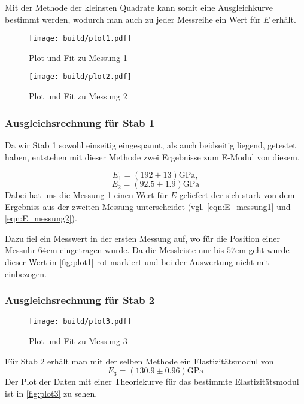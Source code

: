 Mit der Methode der kleinsten Quadrate kann somit eine Ausgleichkurve bestimmt
werden, wodurch man auch zu jeder Messreihe ein Wert für $E$ erhält.

\newpage
\begin{figure}[H]
	\texttt{[image: build/plot1.pdf]}
	\caption{Plot und Fit zu Messung 1}
	\label{fig:plot1}
\end{figure}
\begin{figure}[H]
	\texttt{[image: build/plot2.pdf]}
	\caption{Plot und Fit zu Messung 2}
	\label{fig:plot2}
\end{figure}
\subsubsection{Ausgleichsrechnung für Stab 1}
Da wir Stab 1 sowohl einseitig eingespannt, als auch beidseitig liegend,
getestet haben, entstehen mit dieser Methode zwei Ergebnisse zum E-Modul von diesem.

\begin{equation}
	E_1 = (192 \pm 13) \si{\giga\pascal},
	\label{eqn:E_messung1}
\end{equation}
\begin{equation}
	E_2 = (92.5 \pm 1.9) \si{\giga\pascal}
	\label{eqn:E_messung2}
\end{equation}
Dabei hat uns die Messung 1 einen Wert für $E$ geliefert
der sich stark von dem Ergebniss aus der zweiten Messung unterscheidet (vgl.
\ref{eqn:E_messung1} und \ref{eqn:E_messung2}).

Dazu fiel ein Messwert in der ersten Messung auf, wo für die Position
einer Messuhr
$64 \si{\cm}$ eingetragen wurde. Da die Messleiste nur bis $57 \si{\cm}$ geht
wurde dieser Wert in \autoref{fig:plot1} rot markiert und bei der Auswertung 
nicht mit einbezogen.

\subsubsection{Ausgleichsrechnung für Stab 2}
\begin{figure}[H]
	\texttt{[image: build/plot3.pdf]}
	\caption{Plot und Fit zu Messung 3}
	\label{fig:plot3}
\end{figure}

Für Stab 2 erhält man mit der selben Methode ein Elastizitätsmodul von
\begin{equation}
	E_3 = (130.9 \pm 0.96) \si{\giga\pascal}
	\label{eqn:E_messung3}
\end{equation}
Der Plot der Daten mit einer Theoriekurve für das bestimmte Elastizitätsmodul
ist in \autoref{fig:plot3} zu sehen.
